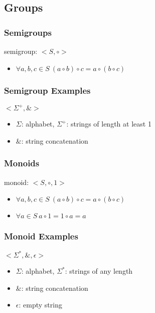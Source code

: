 \documentclass[dvipsnames]{beamer}
\begin{document}
\subsection{Groups}

\begin{frame}
  \frametitle{Semigroups}

  \begin{definition}
    \alert{semigroup}: $<S,\circ>$
    \begin{itemize}
      \item $\forall a,b,c \in S~(a \circ b) \circ c = a \circ (b \circ c)$
    \end{itemize}
  \end{definition}
\end{frame}

\begin{frame}
  \frametitle{Semigroup Examples}

  \begin{example}
    $<\Sigma^+,\&>$

    \begin{itemize}
      \item $\Sigma$: alphabet, $\Sigma^+$: strings of length at least 1
      \item $\&$: string concatenation
    \end{itemize}
  \end{example}
\end{frame}

\begin{frame}
  \frametitle{Monoids}

  \begin{definition}
    \alert{monoid}: $<S,\circ,1>$

    \begin{itemize}
      \item $\forall a,b,c \in S~(a \circ b) \circ c = a \circ (b \circ c)$
      \item $\forall a \in S~a \circ 1 = 1 \circ a = a$
    \end{itemize}
  \end{definition}
\end{frame}

\begin{frame}
  \frametitle{Monoid Examples}

  \begin{example}
    $<\Sigma^*,\&,\epsilon>$

    \begin{itemize}
      \item $\Sigma$: alphabet, $\Sigma^*$: strings of any length
      \item $\&$: string concatenation
      \item $\epsilon$: empty string
    \end{itemize}
  \end{example}
\end{frame}
\end{document}
